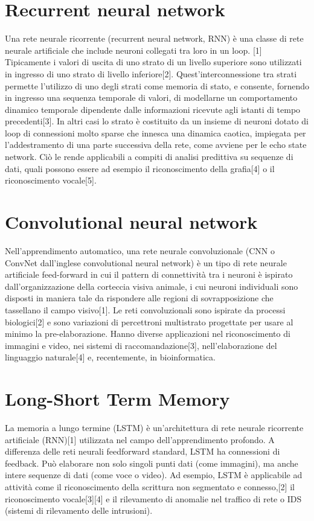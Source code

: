 \documentclass[12pt,a4paper]{report}
\begin{document}
\section*{Recurrent neural network}
Una rete neurale ricorrente (recurrent neural network, RNN) è una classe di rete neurale artificiale che include neuroni collegati tra loro in un loop. [1] Tipicamente i valori di uscita di uno strato di un livello superiore sono utilizzati in ingresso di uno strato di livello inferiore[2]. Quest'interconnessione tra strati permette l'utilizzo di uno degli strati come memoria di stato, e consente, fornendo in ingresso una sequenza temporale di valori, di modellarne un comportamento dinamico temporale dipendente dalle informazioni ricevute agli istanti di tempo precedenti[3]. In altri casi lo strato è costituito da un insieme di neuroni dotato di loop di connessioni molto sparse che innesca una dinamica caotica, impiegata per l'addestramento di una parte successiva della rete, come avviene per le echo state network. Ciò le rende applicabili a compiti di analisi predittiva su sequenze di dati, quali possono essere ad esempio il riconoscimento della grafia[4] o il riconoscimento vocale[5].

\section*{Convolutional neural network}
Nell'apprendimento automatico, una rete neurale convoluzionale (CNN o ConvNet dall'inglese convolutional neural network) è un tipo di rete neurale artificiale feed-forward in cui il pattern di connettività tra i neuroni è ispirato dall'organizzazione della corteccia visiva animale, i cui neuroni individuali sono disposti in maniera tale da rispondere alle regioni di sovrapposizione che tassellano il campo visivo[1]. Le reti convoluzionali sono ispirate da processi biologici[2] e sono variazioni di percettroni multistrato progettate per usare al minimo la pre-elaborazione. Hanno diverse applicazioni nel riconoscimento di immagini e video, nei sistemi di raccomandazione[3], nell'elaborazione del linguaggio naturale[4] e, recentemente, in bioinformatica.
    
\section*{Long-Short Term Memory}
La memoria a lungo termine (LSTM) è un'architettura di rete neurale ricorrente artificiale (RNN)[1] utilizzata nel campo dell'apprendimento profondo. A differenza delle reti neurali feedforward standard, LSTM ha connessioni di feedback. Può elaborare non solo singoli punti dati (come immagini), ma anche intere sequenze di dati (come voce o video). Ad esempio, LSTM è applicabile ad attività come il riconoscimento della scrittura non segmentato e connesso,[2] il riconoscimento vocale[3][4] e il rilevamento di anomalie nel traffico di rete o IDS (sistemi di rilevamento delle intrusioni).
\end{document}
